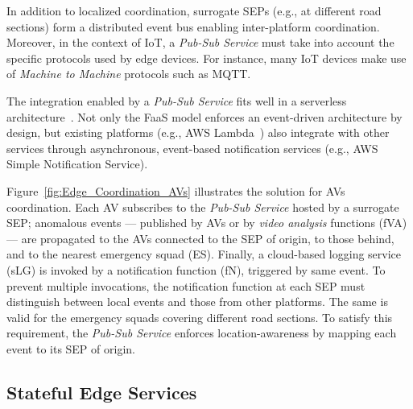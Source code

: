 In addition to localized coordination, surrogate SEPs (e.g., at different road sections) form a distributed event bus enabling inter-platform coordination. Moreover, in the context of IoT, a \textit{Pub-Sub Service} must take into account the specific protocols used by edge devices. For instance, many IoT devices make use of \textit{Machine to Machine} protocols such as MQTT. 

The integration enabled by a \textit{Pub-Sub Service} fits well in a serverless architecture~\cite{Lloyd18serverless}. Not only the FaaS model enforces an event-driven architecture by design, but existing platforms (e.g., AWS Lambda~\cite{AWSLambda}) also integrate with other services through asynchronous, event-based notification services (e.g., AWS Simple Notification Service). 



Figure~\ref{fig:Edge_Coordination_AVs} illustrates the solution for AVs coordination. Each AV subscribes to the \textit{Pub-Sub Service} hosted by a surrogate SEP; anomalous events --- published by AVs or by \textit{video analysis} functions (fVA) --- are propagated to the AVs connected to the SEP of origin, to those behind, and to the nearest emergency squad (ES). Finally, a cloud-based logging service (sLG) is invoked by a notification function (fN), triggered by same event. To prevent multiple invocations, the notification function at each SEP must distinguish between local events and those from other platforms. The same is valid for the emergency squads covering different road sections. To satisfy this requirement, the \textit{Pub-Sub Service} enforces location-awareness by mapping each event to its SEP of origin.

\subsection{Stateful Edge Services}

